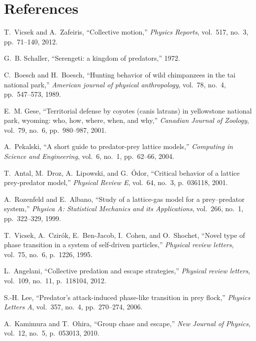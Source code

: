 \documentclass[12pt,a4paper,final]{iopart}
\begin{document}
\section*{References}
\begin{thebibliography}{10}


T.~Vicsek and A.~Zafeiris, ``Collective motion,'' {\em Physics Reports},
vol.~517, no.~3, pp.~71--140, 2012.

G.~B. Schaller, ``Serengeti: a kingdom of predators,'' 1972.

C.~Boesch and H.~Boesch, ``Hunting behavior of wild chimpanzees in the tai
national park,'' {\em American journal of physical anthropology}, vol.~78,
no.~4, pp.~547--573, 1989.

E.~M. Gese, ``Territorial defense by coyotes (canis latrans) in yellowstone
national park, wyoming: who, how, where, when, and why,'' {\em Canadian
Journal of Zoology}, vol.~79, no.~6, pp.~980--987, 2001.

A.~Pekalski, ``A short guide to predator-prey lattice models,'' {\em Computing
in Science and Engineering}, vol.~6, no.~1, pp.~62--66, 2004.

T.~Antal, M.~Droz, A.~Lipowski, and G.~{\'O}dor, ``Critical behavior of a
lattice prey-predator model,'' {\em Physical Review E}, vol.~64, no.~3,
p.~036118, 2001.

A.~Rozenfeld and E.~Albano, ``Study of a lattice-gas model for a prey--predator
system,'' {\em Physica A: Statistical Mechanics and its Applications},
vol.~266, no.~1, pp.~322--329, 1999.

T.~Vicsek, A.~Czir{\'o}k, E.~Ben-Jacob, I.~Cohen, and O.~Shochet, ``Novel type
of phase transition in a system of self-driven particles,'' {\em Physical
review letters}, vol.~75, no.~6, p.~1226, 1995.

L.~Angelani, ``Collective predation and escape strategies,'' {\em Physical
review letters}, vol.~109, no.~11, p.~118104, 2012.

S.-H. Lee, ``Predator's attack-induced phase-like transition in prey flock,''
{\em Physics Letters A}, vol.~357, no.~4, pp.~270--274, 2006.

A.~Kamimura and T.~Ohira, ``Group chase and escape,'' {\em New Journal of
Physics}, vol.~12, no.~5, p.~053013, 2010.


\end{thebibliography}
\end{document}

